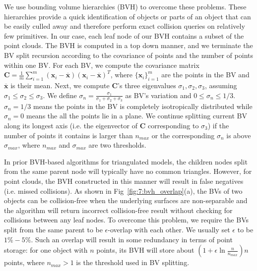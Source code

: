 We use bounding volume hierarchies (BVH) to overcome these problems. These hierarchies provide a quick identification
of objects or parts of an object that can be easily culled away and therefore perform exact collision queries on relatively
few primitives.
In our case, each leaf node of our BVH contains a subset of the point clouds. The BVH is computed in a top down manner, and we terminate the BV split recursion according to
the covariance of points and the number of points within one BV. For each BV, we compute the covariance matrix $\mathbf C = \frac{1}{m} \sum_{i=1}^{m} (\mathbf x_i - \overline{\mathbf x})(\mathbf x_i - \overline{\mathbf x})^T$, where $\{\mathbf x_i\}_{i=1}^m$ are the points in the BV and $\overline{\mathbf x}$ is their mean.
Next, we compute $\mathbf C$'s three eigenvalues $\sigma_1, \sigma_2, \sigma_3$, assuming $\sigma_1 \leq \sigma_2 \leq \sigma_3$. We define $\sigma_n = \frac{\sigma_1}{\sigma_1 + \sigma_2 + \sigma_3}$ as BV's variation and $0 \leq \sigma_n \leq 1/3$. $\sigma_n = 1/3$ means the points in the BV is completely isotropically distributed while $\sigma_n = 0$ means the all the points lie in a plane. We continue splitting current BV along its longest axis (i.e. the eigenvector of $\mathbf C$ corresponding to $\sigma_3$) if the number of points it contains is larger than $n_{max}$ or the corresponding $\sigma_n$ is above $\sigma_{max}$, where $n_{max}$ and $\sigma_{max}$
are two thresholds.

In prior BVH-based algorithms for triangulated models, the children nodes split from the same parent node will typically have no common triangles.
However, for point clouds, the BVH constructed in this manner will result in false negatives (i.e. missed collisions). As shown in Fig~\ref{fig:7:bvh_overlap}(a), the BVs
of two objects can be collision-free when the underlying surfaces are non-separable and the algorithm will return incorrect collision-free result
without checking for collisions between any leaf nodes. To overcome this problem,  we require the BVs split from the same parent to be $\epsilon$-overlap with
each other. We usually set $\epsilon$ to be $1\%- 5\%$. Such  an overlap will result in some redundancy in terms of point storage: for one object with $n$ points, its
BVH will store about $(1+\epsilon \ln \frac{n}{n_{max}} ) n$ points, where $n_{max} > 1$ is the threshold used in BV splitting.


